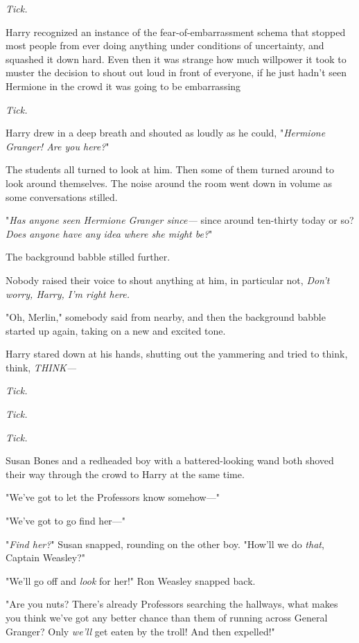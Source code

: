 \emph{Tick.}

Harry recognized an instance of the fear-of-embarrassment schema that stopped
most people from ever doing anything under conditions of uncertainty, and
squashed it down hard. Even then it was strange how much willpower it took to
muster the decision to shout out loud in front of everyone, if he just hadn't
seen Hermione in the crowd it was going to be embarrassing{\el}

\emph{Tick.}

Harry drew in a deep breath and shouted as loudly as he could, "\emph{Hermione
Granger! Are you here?}"

The students all turned to look at him. Then some of them turned around to look
around themselves. The noise around the room went down in volume as some
conversations stilled.

"\emph{Has anyone seen Hermione Granger since---} since around ten-thirty today
or so? \emph{Does anyone have any idea where she might be?}"

The background babble stilled further.

Nobody raised their voice to shout anything at him, in particular not,
\emph{Don't worry, Harry, I'm right here.}

"Oh, Merlin," somebody said from nearby, and then the background babble started
up again, taking on a new and excited tone.

Harry stared down at his hands, shutting out the yammering and tried to think,
think, \emph{THINK---}

\emph{Tick.}

\emph{Tick.}

\emph{Tick.}

Susan Bones and a redheaded boy with a battered-looking wand both shoved their
way through the crowd to Harry at the same time.

"We've got to let the Professors know somehow\mbox{---}"

"We've got to go find her\mbox{---}"

"\emph{Find her?}" Susan snapped, rounding on the other boy. "How'll we do
\emph{that}, Captain Weasley?"

"We'll go off and \emph{look} for her!" Ron Weasley snapped back.

"Are you nuts? There's already Professors searching the hallways, what makes
you think we've got any better chance than them of running across General
Granger? Only \emph{we'll} get eaten by the troll! And then expelled!"

